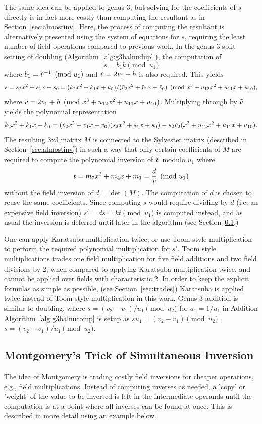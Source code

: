 The same idea can be applied to genus 3, but solving for the coefficients of $s$
directly is in fact more costly than computing the resultant as in
Section~\ref{sec:almostinv}. Here, the process of computing the resultant is
alternatively presented using the system of equations for $s$, requiring the
least number of field operations compared to previous work. In the genus 3 split
setting of doubling (Algorithm~\ref{alg:g3balnudupl}), the computation of $$s =
b_1k \pmod{u_1}$$ where $b_1 = \tilde{v}^{-1} \pmod{u_1}$ and $\tilde{v} = 2v_1 + h$ is also
required. This yields $$s = s_2x^2 + s_1x + s_0 = (k_2x^2 + k_1x +
k_0)/(\tilde{v}_2x^2 + \tilde{v}_1x + \tilde{v}_0) \pmod{x^3 + u_{12}x^2 + u_{11}x + u_{10}},$$
where $\tilde{v} = 2v_1 + h \pmod{x^3 + u_{12}x^2 + u_{11}x + u_{10}}$.  Multiplying
through by $\tilde{v}$ yields the polynomial representation $$ k_2x^2 + k_1x + k_0 =
(\tilde{v}_2x^2 + \tilde{v}_1x + \tilde{v}_0)(s_2x^2 + s_1x + s_0) - s_2\tilde{v}_2(x^3 + u_{12}x^2 +
u_{11}x + u_{10}).$$ The resulting 3x3 matrix $M$ is connected to the
Sylvester matrix (described in Section~\ref{sec:almostinv}) in such a way that
only certain coefficients of $M$ are required to compute the polynomial
inversion of $\tilde{v}$ modulo $u_1$ where $$ t = m_7x^2 + m_4x + m_1 = \frac{d}{\tilde{v}}
\pmod{u_1}$$ without the field inversion of $d = \det(M)$. The computation of
$d$ is chosen to reuse the same coefficients. Since computing $s$ would require
dividing by $d$ (i.e. an expensive field inversion) $s' = ds = kt \pmod{u_1}$ is
computed instead, and as usual the inversion is deferred until later in the
algorithm (see Section~\ref{sec:montgomery}.)

One can apply Karatsuba multiplication twice, or use Toom style
multiplication~\cite[p.294]{Knuth:vol2} to perform the required polynomial
multiplication for $s'$. Toom style multiplications trades one field
multiplication for five field additions and two field divisions by 2, when
compared to applying Karatsuba multiplication twice, and cannot be applied over
fields with characteristic 2. In order to keep the explicit formulas as simple
as possible, (see Section~\ref{sec:trades}) Karatsuba is applied twice instead
of Toom style multiplication in this work.  Genus 3 addition is similar to
doubling, where $s = (v_2 - v_1)/u_1 \pmod{u_2}$ for $a_1 = 1/u_1$ in Addition
Algorithm~\ref{alg:g3balnucomp} is setup as $su_1 = (v_2 - v_1) \pmod{u_2}$. $s
= (v_2 - v_1)/u_1 \pmod{u_2}$.

\subsection{Montgomery's Trick of Simultaneous Inversion}
\label{sec:montgomery}
The idea of Montgomery is trading costly field inversions for cheaper
operations, e.g., field multiplications. Instead of computing inverses as
needed, a 'copy' or 'weight' of the value to be inverted is left in the intermediate
operands until the computation is at a point where all inverses can be found at
once. This is described in more detail using an example below.


